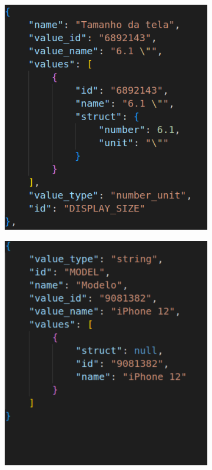 \begin{figure}
\begin{subfigure}{0.33\linewidth}
        \includegraphics[width=\linewidth]{figuras/api-atributo1.png}
        \caption{}
        \label{fig:esims_number}
    \end{subfigure}%
    \begin{subfigure}{0.33\linewidth}
        \includegraphics[width=\linewidth]{figuras/api-atributo3.png}
        \caption{}
        \label{fig:model}
    \end{subfigure}


\end{figure}
